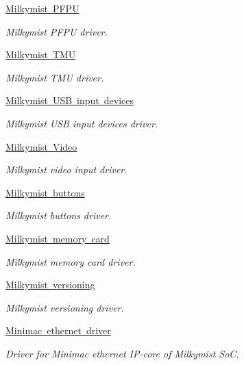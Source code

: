 \begin{DoxyCompactItemize}
\mbox{\hyperlink{group__lm32__milkymist__pfpu}{Milkymist P\+F\+PU}}
\begin{DoxyCompactList}\small\item\em Milkymist P\+F\+PU driver. \end{DoxyCompactList}\item 
\mbox{\hyperlink{group__lm32__milkymist__tmu}{Milkymist T\+MU}}
\begin{DoxyCompactList}\small\item\em Milkymist T\+MU driver. \end{DoxyCompactList}\item 
\mbox{\hyperlink{group__lm32__milkymist__usbinput}{Milkymist U\+S\+B input devices}}
\begin{DoxyCompactList}\small\item\em Milkymist U\+SB input devices driver. \end{DoxyCompactList}\item 
\mbox{\hyperlink{group__lm32__milkymist__video}{Milkymist Video}}
\begin{DoxyCompactList}\small\item\em Milkymist video input driver. \end{DoxyCompactList}\item 
\mbox{\hyperlink{group__lm32__milkymist__buttons}{Milkymist buttons}}
\begin{DoxyCompactList}\small\item\em Milkymist buttons driver. \end{DoxyCompactList}\item 
\mbox{\hyperlink{group__lm32__milkymist__memcard}{Milkymist memory card}}
\begin{DoxyCompactList}\small\item\em Milkymist memory card driver. \end{DoxyCompactList}\item 
\mbox{\hyperlink{group__lm32__milkymist__versions}{Milkymist versioning}}
\begin{DoxyCompactList}\small\item\em Milkymist versioning driver. \end{DoxyCompactList}\item 
\mbox{\hyperlink{group__lm32__milkymist__network}{Minimac ethernet driver}}
\begin{DoxyCompactList}\small\item\em Driver for Minimac ethernet I\+P-\/core of Milkymist SoC. \end{DoxyCompactList}\end{DoxyCompactItemize}
